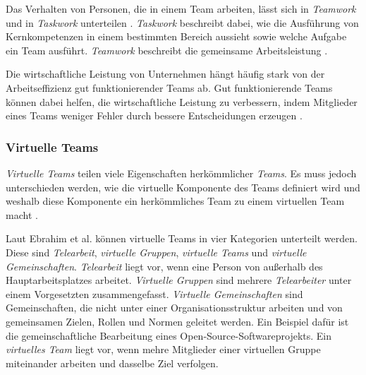 \documentclass[a4paper,11pt]{article}%
\renewcommand{\\}{\vspace*{0.5\baselineskip} \newline}
\begin{document}
Das Verhalten von Personen, die in einem Team arbeiten, lässt sich in \textit{Teamwork} und in  \textit{Taskwork} unterteilen \citep[S. 541-542]{rousseau2006teamwork}.
 \textit{Taskwork} beschreibt dabei, wie die Ausführung von Kernkompetenzen in einem bestimmten Bereich aussieht sowie welche Aufgabe ein Team ausführt.
 \textit{Teamwork} beschreibt die gemeinsame Arbeitsleistung \citep[S. 357]{marks2001temporally}.
 
Die wirtschaftliche Leistung von Unternehmen hängt häufig stark von der Arbeitseffizienz gut funktionierender Teams ab. Gut funktionierende Teams können dabei helfen, die wirtschaftliche Leistung zu verbessern, indem Mitglieder eines Teams weniger Fehler durch bessere Entscheidungen erzeugen \citep[S. 1-6]{biech2007pfeiffer}. 
%
\subsubsection{Virtuelle Teams}
\label{vts}
\textit{Virtuelle Teams} teilen viele Eigenschaften herkömmlicher \textit{Teams}. Es muss jedoch unterschieden werden, wie die virtuelle Komponente des Teams definiert wird und weshalb diese Komponente ein herkömmliches Team zu einem virtuellen Team macht \citep[S. 270]{schweitzer2010conceptualizing}.

Laut Ebrahim et al. \citep{ale2009virtual} können virtuelle Teams in vier Kategorien unterteilt werden.
Diese sind \textit{Telearbeit}, \textit{virtuelle Gruppen}, \textit{virtuelle Teams} und \textit{virtuelle Gemeinschaften}.
\textit{Telearbeit} liegt vor, wenn eine Person von außerhalb des Hauptarbeitsplatzes arbeitet. \textit{Virtuelle Gruppen} sind mehrere \textit{Telearbeiter} unter einem Vorgesetzten zusammengefasst.
\textit{Virtuelle Gemeinschaften} sind Gemeinschaften, die nicht unter einer Organisationsstruktur arbeiten und von gemeinsamen Zielen, Rollen und Normen geleitet werden. Ein Beispiel dafür ist die gemeinschaftliche Bearbeitung eines Open-Source-Softwareprojekts. Ein \textit{virtuelles Team} liegt vor, wenn mehre Mitglieder einer virtuellen Gruppe miteinander arbeiten und dasselbe Ziel verfolgen.
 
\end{document}
